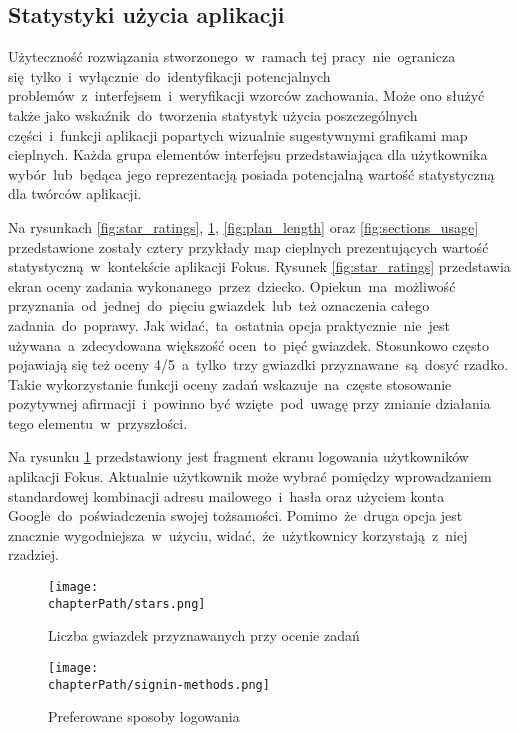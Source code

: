\subsection{Statystyki użycia aplikacji}
Użyteczność rozwiązania stworzonego~w~ramach tej pracy~nie~ogranicza się~tylko~i~wyłącznie~do~identyfikacji potencjalnych problemów~z~interfejsem~i~weryfikacji wzorców zachowania. Może ono służyć także jako wskaźnik~do~tworzenia statystyk użycia poszczególnych części~i~funkcji aplikacji popartych wizualnie sugestywnymi grafikami map cieplnych. Każda grupa elementów interfejsu przedstawiająca dla użytkownika wybór~lub~będąca jego reprezentacją posiada potencjalną wartość statystyczną dla twórców aplikacji.

Na rysunkach \ref{fig:star_ratings}, \ref{fig:signin_methods}, \ref{fig:plan_length} oraz \ref{fig:sections_usage} przedstawione zostały cztery przykłady map cieplnych prezentujących wartość statystyczną~w~kontekście aplikacji Fokus. Rysunek \ref{fig:star_ratings} przedstawia ekran oceny zadania wykonanego~przez~dziecko. Opiekun~ma~możliwość przyznania~od~jednej~do~pięciu gwiazdek~lub~też oznaczenia całego zadania~do~poprawy. Jak widać,~ta~ostatnia opcja praktycznie~nie~jest używana~a~zdecydowana większość ocen~to~pięć gwiazdek. Stosunkowo często pojawiają się też oceny 4/5~a~tylko~trzy gwiazdki przyznawane~są~dosyć rzadko. Takie wykorzystanie funkcji oceny zadań wskazuje~na~częste stosowanie pozytywnej afirmacji~i~powinno być wzięte~pod~uwagę przy zmianie działania tego elementu~w~przyszłości.

Na rysunku \ref{fig:signin_methods} przedstawiony jest fragment ekranu logowania użytkowników aplikacji Fokus. Aktualnie użytkownik może wybrać pomiędzy wprowadzaniem standardowej kombinacji adresu mailowego~i~hasła oraz użyciem konta Google~do~poświadczenia swojej tożsamości. Pomimo~że~druga opcja jest znacznie wygodniejsza~w~użyciu, widać,~że~użytkownicy korzystają~z~niej rzadziej.

\bigskip
\begin{figure}[H]
\centering
\begin{minipage}{.45\textwidth}
	\centering
	\texttt{[image: \\chapterPath/stars.png]}
	\bigskip
	\caption{Liczba gwiazdek przyznawanych przy ocenie zadań}
	\label{fig:star_ratings}
\end{minipage}
\begin{minipage}{.45\textwidth}
	\centering
	\texttt{[image: \\chapterPath/signin-methods.png]}
	\bigskip
	\caption{Preferowane sposoby logowania}
	\label{fig:signin_methods}
\end{minipage}
\end{figure}

